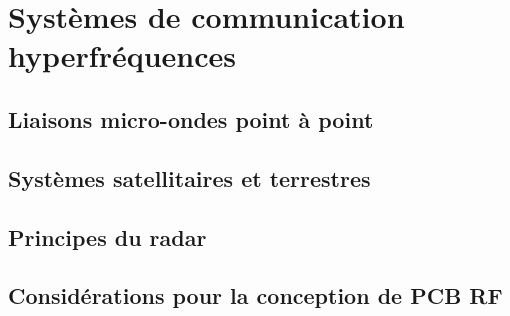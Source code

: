 \chapter{Systèmes de communication hyperfréquences} \label{sec:microwave_communications}
\section{Liaisons micro-ondes point à point} \label{subsec:microwave_links}
\section{Systèmes satellitaires et terrestres} \label{subsec:satellite_systems}
\section{Principes du radar} \label{subsec:radar}
\section{Considérations pour la conception de PCB RF} \label{subsec:rf_pcb}
